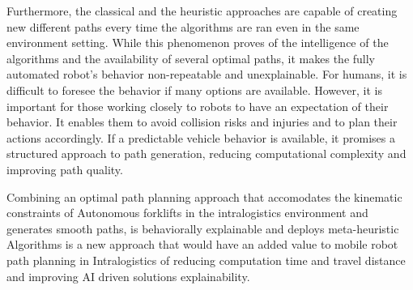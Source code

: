 Furthermore, the classical and the heuristic approaches are capable of creating new different paths every time the 
algorithms are ran even in the same environment setting. While this phenomenon proves of the intelligence of the algorithms
and the availability of several optimal paths, it makes the fully automated robot's behavior non-repeatable and unexplainable. 
For humans, it is difficult to foresee the behavior if many options are available. However, it is important for those working 
closely to robots to have an expectation of their behavior. It enables them to avoid collision risks and injuries and to 
plan their actions accordingly. If a predictable vehicle behavior is available, it promises a structured approach to path 
generation, reducing computational complexity and improving path quality.

Combining an optimal path planning approach that accomodates the kinematic constraints of Autonomous forklifts in the
intralogistics environment and generates smooth paths, is behaviorally explainable and deploys meta-heuristic Algorithms
is a new approach that would have an added value to mobile robot path planning in Intralogistics of reducing 
computation time and travel distance and improving AI driven solutions explainability. 




